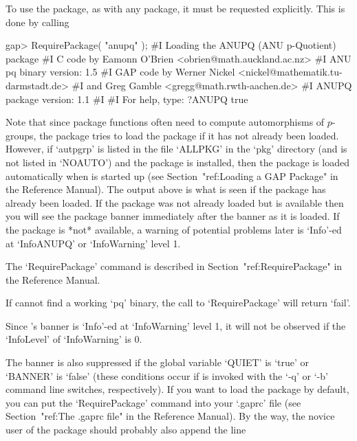 \endlist


To use the {\ANUPQ} package, as with  any  {\GAP}  package,  it  must  be
requested explicitly. This is done by calling

\beginexample
gap> RequirePackage( "anupq" );
#I    Loading the ANUPQ (ANU p-Quotient) package
#I    C code by  Eamonn O'Brien <obrien@math.auckland.ac.nz>
#I                ANU pq binary version: 1.5
#I    GAP code by Werner Nickel <nickel@mathematik.tu-darmstadt.de>
#I            and   Greg Gamble  <gregg@math.rwth-aachen.de>
#I                ANUPQ package version: 1.1
#I  
#I                For help, type: ?ANUPQ
true
\endexample

Note  that  since  {\ANUPQ}  package  functions  often  need  to  compute
automorphisms  of $p$-groups,  the  {\ANUPQ} package  tries  to load  the
{\AutPGrp}  package if  it  has  not already  been  loaded.  However,  if
`autpgrp' is listed  in the file `ALLPKG' in the  `pkg' directory (and is
not listed in `NOAUTO') and the {\AutPGrp} package is installed, then the
{\AutPGrp} package is loaded automatically when {\GAP} is started up (see
Section~"ref:Loading a GAP Package"  in the Reference Manual). The output
above is what is seen if  the {\AutPGrp} package has already been loaded. 
If the  {\AutPGrp} package was not  already loaded but  is available then
you will see the {\AutPGrp} package banner immediately after the {\ANUPQ}
banner as it is loaded.  If  the {\AutPGrp} package is *not* available, a
warning  of  potential problems  later  is  `Info'-ed  at `InfoANUPQ'  or
`InfoWarning' level 1.

The `RequirePackage' command is described in Section~"ref:RequirePackage"
in the {\GAP} Reference Manual.

If {\GAP} cannot find a working `pq' binary, the call to `RequirePackage'
will return `fail'.

Since {\ANUPQ}'s banner is `Info'-ed at `InfoWarning' level  1,  it  will
not be observed if the `InfoLevel' of `InfoWarning' is 0.

The banner is also suppressed if the global {\GAP}  variable  `QUIET'  is
`true' or `BANNER' is  `false'  (these  conditions  occur  if  {\GAP}  is
invoked with the `-q' or `-b' command line  switches,  respectively).  If
you want to load the  {\ANUPQ}  package  by  default,  you  can  put  the
`RequirePackage' command into your `.gaprc'  file  (see  Section~"ref:The
.gaprc file" in the {\GAP} Reference Manual). By the way, the novice user
of the {\ANUPQ} package should probably also append the line

